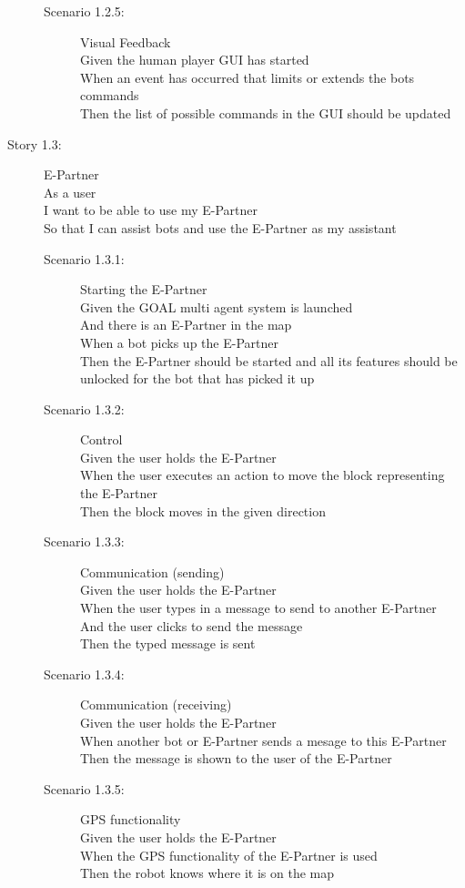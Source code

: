 \documentclass{article}
\begin{document}
\begin{description}
\begin{description}
    \item[Scenario 1.2.5:] Visual Feedback\\
    Given the human player GUI has started\\
    When an event has occurred that limits or extends the bots commands\\
    Then the list of possible commands in the GUI should be updated
  \end{description}
  \item[Story 1.3:] E-Partner\\
  As a user\\
  I want to be able to use my E-Partner\\
  So that I can assist bots and use the E-Partner as my assistant

  \begin{description}
    \item[Scenario 1.3.1:] Starting the E-Partner\\
    Given the GOAL multi agent system is launched\\
    And there is an E-Partner in the map\\
    When a bot picks up the E-Partner\\
    Then the E-Partner should be started and all its features should be unlocked for the bot that has picked it up
    
    \item[Scenario 1.3.2:] Control\\
    Given the user holds the E-Partner\\
    When the user executes an action to move the block representing the E-Partner\\
    Then the block moves in the given direction
    
    \item[Scenario 1.3.3:] Communication (sending)\\
    Given the user holds the E-Partner\\
    When the user types in a message to send to another E-Partner\\
    And the user clicks to send the message\\
    Then the typed message is sent
    
    \item[Scenario 1.3.4:] Communication (receiving)\\
    Given the user holds the E-Partner\\
    When another bot or E-Partner sends a mesage to this E-Partner\\
    Then the message is shown to the user of the E-Partner
    
    \item[Scenario 1.3.5:] GPS functionality\\
    Given the user holds the E-Partner\\
    When the GPS functionality of the E-Partner is used\\
    Then the robot knows where it is on the map
  \end{description}
\end{description}
\end{document}
